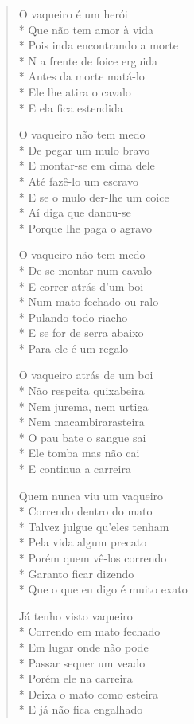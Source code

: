 \begin{verse}
O vaqueiro é um herói\\*
Que não tem amor à vida\\*
Pois inda encontrando a morte\\*
N a frente de foice erguida\\*
Antes da morte matá-lo\\*
Ele lhe atira o cavalo\\*
E ela fica estendida

O vaqueiro não tem medo\\*
De pegar um mulo bravo\\*
E montar-se em cima dele\\*
Até fazê-lo um escravo\\*
E se o mulo der-lhe um coice\\*
Aí diga que danou-se\\*
Porque lhe paga o agravo

O vaqueiro não tem medo\\*
De se montar num cavalo\\*
E correr atrás d'um boi\\*
Num mato fechado ou ralo\\*
Pulando todo riacho\\*
E se for de serra abaixo\\*
Para ele é um regalo

O vaqueiro atrás de um boi\\*
Não respeita quixabeira\\*
Nem jurema, nem urtiga\\*
Nem macambirarasteira\\*
O pau bate o sangue sai\\*
Ele tomba mas não cai\\*
E continua a carreira

Quem nunca viu um vaqueiro\\*
Correndo dentro do mato\\*
Talvez julgue qu'eles tenham\\*
Pela vida algum precato\\*
Porém quem vê-los correndo\\*
Garanto ficar dizendo\\*
Que o que eu digo é muito exato

Já tenho visto vaqueiro\\*
Correndo em mato fechado\\*
Em lugar onde não pode\\*
Passar sequer um veado\\*
Porém ele na carreira\\*
Deixa o mato como esteira\\*
E já não fica engalhado


\end{verse}

